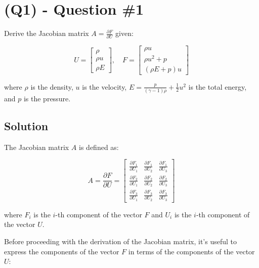 \section{(Q1) - Question \#1}
\label{sec:Q1}

Derive the Jacobian matrix $A = \frac{\partial F}{\partial U}$ given:

\begin{equation}
    U = \begin{bmatrix}
        \rho   \\
        \rho u \\
        \rho E
    \end{bmatrix}, \quad
    F = \begin{bmatrix}
        \rho u       \\
        \rho u^2 + p \\
        (\rho E + p) u
    \end{bmatrix}
\end{equation}

where $\rho$ is the density, $u$ is the velocity, $E = \frac{p}{(\gamma - 1) \rho} + \frac{1}{2} u^2$ is the total energy, and $p$ is the pressure.

\subsection{Solution}

The Jacobian matrix $A$ is defined as:

\begin{equation}
    A = \frac{\partial F}{\partial U} = \begin{bmatrix}
        \frac{\partial F_1}{\partial U_1} & \frac{\partial F_1}{\partial U_2} & \frac{\partial F_1}{\partial U_3} \\
        \frac{\partial F_2}{\partial U_1} & \frac{\partial F_2}{\partial U_2} & \frac{\partial F_2}{\partial U_3} \\
        \frac{\partial F_3}{\partial U_1} & \frac{\partial F_3}{\partial U_2} & \frac{\partial F_3}{\partial U_3}
    \end{bmatrix}
    \label{eq:jacobian_matrix}
\end{equation}

where $F_i$ is the $i$-th component of the vector $F$ and $U_i$ is the $i$-th component of the vector $U$.

Before proceeding with the derivation of the Jacobian matrix, it's useful to express the components of the vector $F$ in terms of the components of the vector $U$:

